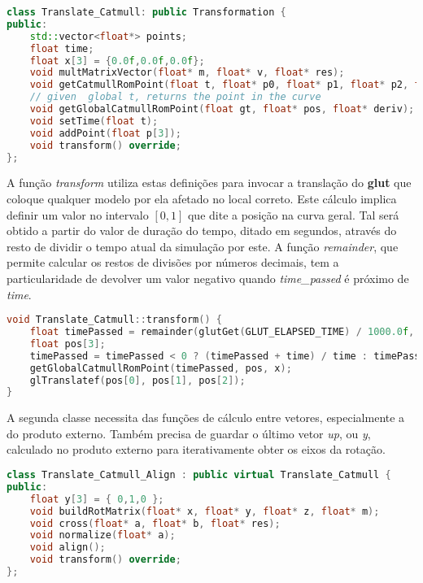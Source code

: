 \documentclass[14pt, a4 paper]{report}
\begin{document}
\begin{lstlisting}[language=c++]
class Translate_Catmull: public Transformation {
public:
    std::vector<float*> points;
    float time;
    float x[3] = {0.0f,0.0f,0.0f};
    void multMatrixVector(float* m, float* v, float* res);
    void getCatmullRomPoint(float t, float* p0, float* p1, float* p2, float* p3, float* pos, float* deriv);
    // given  global t, returns the point in the curve
    void getGlobalCatmullRomPoint(float gt, float* pos, float* deriv);
    void setTime(float t);
    void addPoint(float p[3]);
    void transform() override;  
};

\end{lstlisting}

A função \textit{transform} utiliza estas definições para invocar a translação do \textbf{glut} que coloque qualquer modelo por ela afetado no local correto. Este cálculo implica definir um valor no intervalo $[0,1]$ que dite a posição na curva geral. Tal será obtido a partir do valor de duração do tempo, ditado em segundos, através do resto de dividir o tempo atual da simulação por este. A função \textit{remainder}, que permite calcular os restos de divisões por números decimais, tem a particularidade de devolver um valor negativo quando \textit{time\_passed} é próximo de \textit{time}.

\begin{lstlisting}[language = c++]
void Translate_Catmull::transform() {
    float timePassed = remainder(glutGet(GLUT_ELAPSED_TIME) / 1000.0f, time);
    float pos[3];
    timePassed = timePassed < 0 ? (timePassed + time) / time : timePassed / time;
    getGlobalCatmullRomPoint(timePassed, pos, x);
    glTranslatef(pos[0], pos[1], pos[2]);
}
\end{lstlisting}

A segunda classe necessita das funções de cálculo entre vetores, especialmente a do produto externo. Também precisa de guardar o último vetor \textit{up}, ou \textit{y}, calculado no produto externo para iterativamente obter os eixos da rotação.

\begin{lstlisting}[language = c++]
class Translate_Catmull_Align : public virtual Translate_Catmull {
public:
    float y[3] = { 0,1,0 };
    void buildRotMatrix(float* x, float* y, float* z, float* m);
    void cross(float* a, float* b, float* res);
    void normalize(float* a);
    void align();
    void transform() override;
};
\end{lstlisting}
\end{document}
